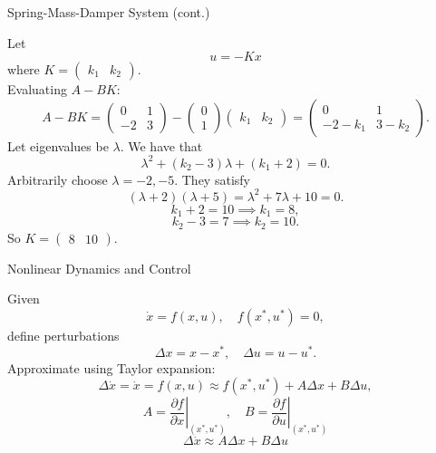 \documentclass{beamer}
\newcommand{\dx}{\dot{x}}
\begin{document}
\begin{frame}{Spring-Mass-Damper System (cont.)}

    Let
    $$u = -Kx$$
    where $K = 
    \begin{pmatrix}
        k_1 & k_2
    \end{pmatrix}$. \\
    Evaluating $A - BK$:
    $$A - BK =
    \begin{pmatrix} 0 & 1 \\ -2 & 3 \end{pmatrix} -
    \begin{pmatrix} 0 \\ 1 \end{pmatrix}
    \begin{pmatrix} k_1 & k_2 \end{pmatrix} =
    \begin{pmatrix} 0 & 1 \\ -2 - k_1 & 3 - k_2 \end{pmatrix}.$$
    \pause
    Let eigenvalues be $\lambda$. We have that
    $$\lambda^2 + (k_2 - 3)\lambda + (k_1 + 2) = 0.$$
    \pause
    Arbitrarily choose $\lambda = -2, -5$. They satisfy $$(\lambda + 2)(\lambda + 5) = \lambda^2 + 7\lambda + 10 = 0.$$
    \pause
    $$k_1 + 2 = 10 \implies k_1 = 8,$$
    $$k_2 - 3 = 7 \implies k_2 = 10.$$
    So $K = 
    \begin{pmatrix}
        8 & 10
    \end{pmatrix}$.
    
\end{frame}

\begin{frame}{Nonlinear Dynamics and Control}

    Given
    $$\dx = f(x, u), \quad f(x^*, u^*) = 0,$$
    define perturbations
    $$\Delta x = x - x^*, \quad \Delta u  = u - u^*.$$
    Approximate using Taylor expansion:
    $$\Delta \dx = \dx = f(x, u) \approx f(x^*, u^*) + A\Delta x + B\Delta u,$$
    $$A = \left.\frac{\partial f}{\partial x}\right|_{(x^*, u^*)}, \quad B = \left.\frac{\partial f}{\partial u}\right|_{(x^*, u^*)}$$
    $$\Delta \dx \approx A\Delta x + B\Delta u$$
    
\end{frame}
\end{document}
